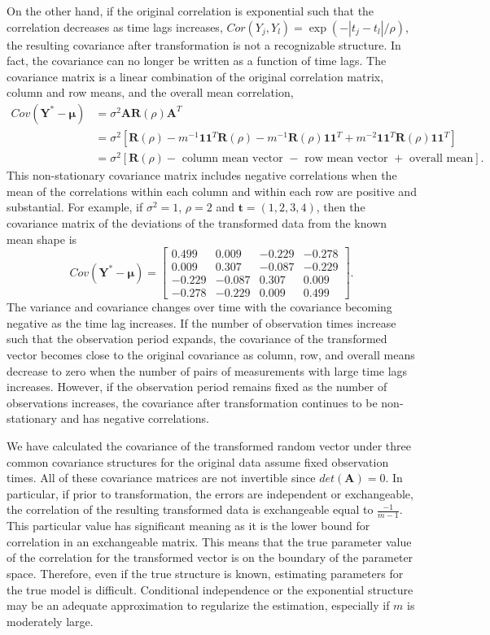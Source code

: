 \documentclass[12pt]{article}
\newcommand{\B}[0]{\mathbf}
\newcommand{\BS}[0]{\boldsymbol}
\begin{document}
 On the other hand, if the original correlation is exponential such that the correlation decreases as time lags increases, $Cor(Y_{j},Y_{l}) = \exp(-|t_{j}-t_{l}|/\rho)$, the resulting covariance after transformation is not a recognizable structure. In fact, the covariance can no longer be written as a function of time lags. The covariance matrix is a linear combination of the original correlation matrix, column and row means, and the overall mean correlation,
   \begin{align*}
 Cov(\B Y^{*}- \BS\mu) &= \sigma^{2}\B A\B R(\rho)\B A^{T}\\
 &= \sigma^{2}\left[\B R(\rho)-m^{-1}\B1\B1^{T}\B R(\rho)-m^{-1}\B R(\rho)\B1\B1^{T} + m^{-2}\B1\B1^{T}\B R(\rho)\B1\B1^{T}\right]\\
  &= \sigma^{2}\left[\B R(\rho)-\text{ column mean vector }-\text{ row mean vector } + \text{ overall mean}\right].
 \end{align*} 
 This non-stationary covariance matrix includes negative correlations when the mean of the correlations within each column and within each row are positive and substantial. For example, if $\sigma^{2}=1$, $\rho = 2$ and $\B t=(1,2,3,4)$, then the covariance matrix of the deviations of the transformed data from the known mean shape is
$$ Cov(\B Y^{*}- \BS\mu) = \left[ \begin{array}{cccc}
 0.499&  0.009& -0.229& -0.278\\
  0.009&  0.307& -0.087& -0.229\\
 -0.229& -0.087&  0.307&  0.009\\
 -0.278& -0.229&  0.009&  0.499
\end{array}\right].$$
The variance and covariance changes over time with the covariance becoming negative as the time lag increases.  If the number of observation times increase such that the observation period expands, the covariance of the transformed vector becomes close to the original covariance as column, row, and overall means decrease to zero when the number of pairs of measurements with large time lags increases. However, if the observation period remains fixed as the number of observations increases, the covariance after transformation continues to be non-stationary and has negative correlations.  

We have calculated the covariance of the transformed random vector under three common covariance structures for the original data assume fixed observation times. All of these covariance matrices are not invertible since $det(\B A) = 0$. In particular, if prior to transformation, the errors are independent or exchangeable, the correlation of the resulting transformed data is exchangeable equal to $\frac{-1}{m-1}$. This particular value has significant meaning as it is the lower bound for correlation in an exchangeable matrix. This means that the true parameter value of the correlation for the transformed vector is on the boundary of the parameter space. Therefore, even if the true structure is known, estimating parameters for the true model is difficult. Conditional independence or the exponential structure may be an adequate approximation to regularize the estimation, especially if $m$ is moderately large.
\end{document}
